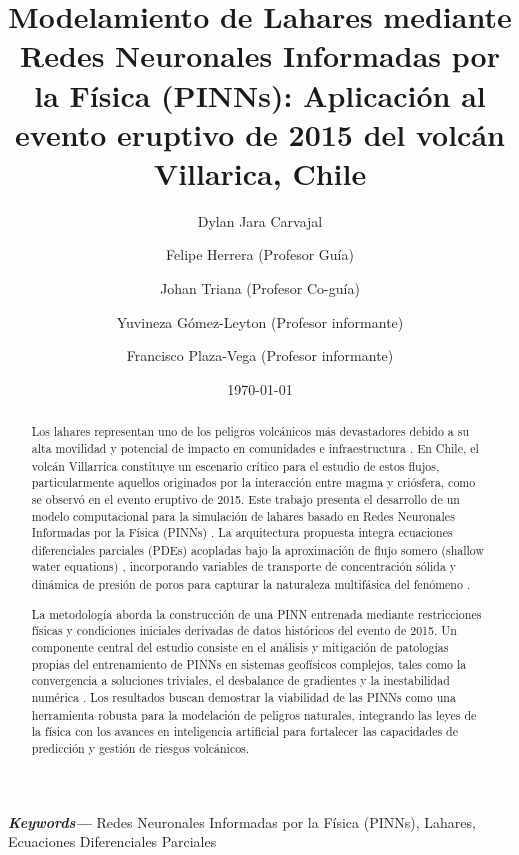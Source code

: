 \documentclass[11pt]{article}
\title{Modelamiento de Lahares mediante Redes Neuronales Informadas por la Física (PINNs): Aplicación al evento eruptivo de 2015 del volcán Villarica, Chile}
\author[1]{Dylan Jara Carvajal}
\author[2]{Felipe Herrera (Profesor Guía)}
\author[3]{Johan Triana (Profesor Co-guía)}
\author[3]{Yuvineza Gómez-Leyton (Profesor informante)}
\author[1]{Francisco Plaza-Vega (Profesor informante)}
\affil[1]{Departamento de Matemática y Ciencia de la Computación\\Universidad de Santiago de Chile}
\affil[2]{Departamento de Física\\Universidad de Santiago de Chile}
\affil[3]{Departamento de Física\\Universidad Católica del Norte}
\date{\today}
\providecommand{\keywords}[1]
{
  \small	
  \textbf{\textit{Keywords---}} #1
}
\begin{document}
\maketitle
  
\begin{abstract}
    \singlespacing %
    \small %
        Los lahares representan uno de los peligros volcánicos más devastadores debido a su alta movilidad y potencial de impacto en comunidades e infraestructura \textbf{\cite{Vallance2024,porfido2020new,ortiz1996riesgo}}. En Chile, 
        el volcán Villarrica constituye un escenario crítico para el estudio de estos flujos, particularmente aquellos originados por la interacción entre magma y criósfera, 
        como se observó en el evento eruptivo de 2015. Este trabajo presenta el desarrollo de un modelo computacional para la simulación de lahares basado en 
        Redes Neuronales Informadas por la Física (PINNs) \textbf{\cite{RAISSI2019686,cai2021physics}}. La arquitectura propuesta integra ecuaciones diferenciales parciales (PDEs) acopladas bajo la aproximación de flujo somero 
        (shallow water equations) \textbf{\cite{woodhouseshallow}}, incorporando variables de transporte de concentración sólida y dinámica de presión de poros \textbf{\cite{phdthesis}} para capturar la naturaleza multifásica del fenómeno \textbf{\cite{schilling2008using,george2025d}}.

        La metodología aborda la construcción de una PINN entrenada mediante restricciones físicas y condiciones iniciales derivadas de datos históricos del evento de 2015. 
        Un componente central del estudio consiste en el análisis y mitigación de patologías propias del entrenamiento de PINNs en sistemas geofísicos complejos, tales como 
        la convergencia a soluciones triviales, el desbalance de gradientes y la inestabilidad numérica \textbf{\cite{krishnapriyan2021characterizing,raissi2024physics}}. Los resultados buscan demostrar la viabilidad de las PINNs como una
        herramienta robusta para la modelación de peligros naturales, integrando las leyes de la física con los avances en inteligencia artificial para fortalecer las capacidades de predicción 
        y gestión de riesgos volcánicos.  
\end{abstract}

\vspace{5mm} %
\keywords{Redes Neuronales Informadas por la Física (PINNs), Lahares, Ecuaciones Diferenciales Parciales}
\end{document}
